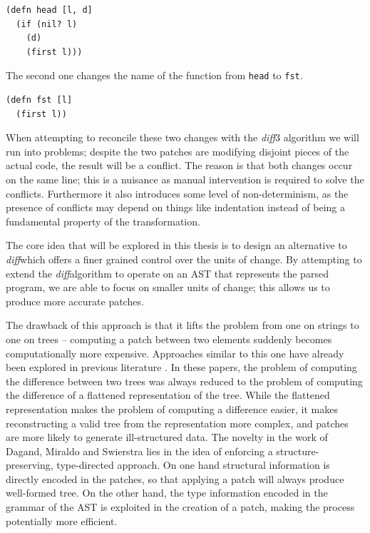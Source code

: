 \documentclass[11pt, titlepage]{article}
\newcommand{\toClojure}[1]{\texttt{#1}\xspace}
\newcommand{\diff}{\emph{diff}}
\begin{document}
\begin{verbatim}
(defn head [l, d]
  (if (nil? l)
    (d)
    (first l)))
\end{verbatim}

The second one changes the name of the function from \toClojure{head} to \toClojure{fst}.
\begin{verbatim}
(defn fst [l]
  (first l))
\end{verbatim}

When attempting to reconcile these two changes with the \diff3 algorithm we will run into problems; despite the two patches are modifying disjoint pieces of the actual code, the result will be a conflict.
The reason is that both changes occur on the same line; this is a nuisance as manual intervention is required to solve the conflicts. Furthermore it also introduces some level of non-determinism, as the presence of conflicts may depend on things like indentation instead of being a fundamental property of the transformation. 

The core idea that will be explored in this thesis is to design an alternative to \diff which offers a finer grained control over the units of change. By attempting to extend the \diff algorithm to operate on an AST that represents the parsed program, we are able to focus on smaller units of change; this allows us to produce more accurate patches. 

The drawback of this approach is that it lifts the problem from one on strings to one on trees --
 computing a patch between two elements suddenly becomes computationally more expensive. 
Approaches similar to this one have already been explored in previous literature \cite{semantics-VC, structure-aware-VC, Vassena}. In these papers, the problem of computing the difference between two trees was always reduced to the problem of computing the difference of a flattened representation of the tree. 
While the flattened representation makes the problem of computing a difference easier, it makes reconstructing a valid tree from the representation more complex, and patches are more likely to generate ill-structured data.  
The novelty in the work of Dagand, Miraldo and Swierstra \cite{type-directed-diff} lies in the idea of enforcing a structure-preserving, type-directed approach. 
On one hand structural information is directly encoded in the patches, so that applying a patch will always produce well-formed tree. 
On the other hand, the type information encoded in the grammar of the AST is exploited in the creation of a patch, making the process potentially more efficient.
\end{document}
